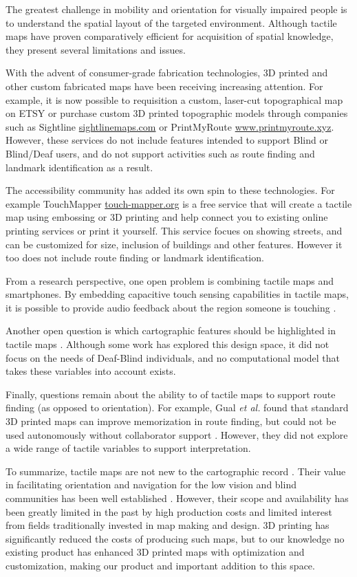 The greatest challenge in mobility and orientation for visually impaired people is to understand the spatial layout of the targeted environment. 
Although  tactile  maps  have proven comparatively efficient  for  acquisition  of  spatial  knowledge,  they  present  several limitations  and  issues.

With the advent of consumer-grade fabrication technologies, 3D printed and other custom fabricated maps have been receiving increasing attention. For example, it is now possible to requisition a custom, laser-cut topographical map on ETSY \cite{etsy} or purchase custom 3D printed topographic models through companies such as Sightline \url{sightlinemaps.com} or PrintMyRoute \url{www.printmyroute.xyz}. However, these services do not include features intended to support Blind or Blind/Deaf users, and do not support activities such as route finding and landmark identification as a result. 

The accessibility community has added its own spin to these technologies. For example TouchMapper \url{touch-mapper.org} is a free service that will create a tactile map using embossing or 3D printing and help connect you to existing online printing services or print it yourself.  This service focues on showing streets, and can be customized for size, inclusion of buildings and other features. However it too does not include route finding or landmark identification. 

From a research perspective, one open problem is combining tactile maps and smartphones. By embedding capacitive touch sensing capabilities in tactile maps, it is possible to provide audio feedback about the region someone is touching \cite{taylor2016customizable, rusu2010semantic,gotzelmann2016lucentmaps}. 

Another open question is which cartographic features should be highlighted in tactile maps \cite{haberling2008proposed}. Although some work has explored this design space, it did not focus on the needs of Deaf-Blind individuals, and no computational model that takes these variables into account exists.

Finally, questions remain about the ability to of tactile maps to support route finding (as opposed to orientation). For example, Gual \textit{et al.} found that standard 3D printed maps can improve memorization in route finding, but could not be used autonomously without collaborator support \cite{gual2012visual}. However, they did not explore a wide range of tactile variables to support interpretation. 

To summarize, tactile maps are not new to the cartographic record \cite{xx}. Their value in facilitating orientation and navigation for the low vision and blind communities has been well established \cite{XXX}. However, their scope and availability has been greatly limited in the past by high production costs and limited interest from fields traditionally invested in map making and design.  3D printing has significantly reduced the costs of producing such maps, but to our knowledge no existing product has enhanced 3D printed maps with optimization and customization, making our product and important addition to this space. 

